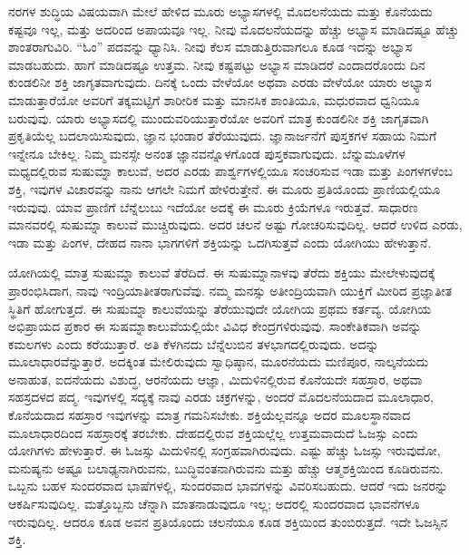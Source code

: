 ನರಗಳ ಶುದ್ಧಿಯ ವಿಷಯವಾಗಿ ಮೇಲೆ ಹೇಳಿದ ಮೂರು ಅಭ್ಯಾಸಗಳಲ್ಲಿ ಮೊದಲನೆಯದು ಮತ್ತು ಕೊನೆಯದು ಕಷ್ಟವೂ ಇಲ್ಲ, ಮತ್ತು ಅದರಿಂದ ಅಪಾಯವೂ ಇಲ್ಲ. ನೀವು ಮೊದಲನೆಯದನ್ನು ಹೆಚ್ಚು ಅಭ್ಯಾಸ ಮಾಡಿದಷ್ಟೂ ಹೆಚ್ಚು ಶಾಂತರಾಗುವಿರಿ. “ಓಂ” ಪದವನ್ನು ಧ್ಯಾನಿಸಿ. ನೀವು ಕೆಲಸ ಮಾಡುತ್ತಿರುವಾಗಲೂ ಕೂಡ ಇದನ್ನು ಅಭ್ಯಾಸ ಮಾಡಬಹುದು. ಹಾಗೆ ಮಾಡಿದಷ್ಟೂ ಉತ್ತಮ. ನೀವು ಕಷ್ಟಪಟ್ಟು ಅಭ್ಯಾಸ ಮಾಡಿದರೆ ಎಂದಾದರೊಂದು ದಿನ ಕುಂಡಲಿನೀ ಶಕ್ತಿ ಜಾಗೃತವಾಗುವುದು. ದಿನಕ್ಕೆ ಒಂದು ವೇಳೆಯೋ ಅಥವಾ ಎರಡು ವೇಳೆಯೋ ಯಾರು ಅಭ್ಯಾಸ ಮಾಡುತ್ತಾರೆಯೋ ಅವರಿಗೆ ತಕ್ಕಮಟ್ಟಿಗೆ ಶಾರೀರಿಕ ಮತ್ತು ಮಾನಸಿಕ ಶಾಂತಿಯೂ, ಮಧುರವಾದ ಧ್ವನಿಯೂ ಬರುವುವು. ಯಾರು ಅಭ್ಯಾಸದಲ್ಲಿ ಮುಂದುವರಿಯುತ್ತಾರೆಯೋ ಅವರಿಗೆ ಮಾತ್ರ ಕುಂಡಲಿನೀ ಶಕ್ತಿ ಜಾಗೃತವಾಗಿ ಪ್ರಕೃತಿಯೆಲ್ಲ ಬದಲಾಯಿಸುವುದು, ಜ್ಞಾನ ಭಂಡಾರ ತೆರೆಯುವುದು. ಜ್ಞಾನಾರ್ಜನೆಗೆ ಪುಸ್ತಕಗಳ ಸಹಾಯ ನಿಮಗೆ ಇನ್ನೇನೂ ಬೇಕಿಲ್ಲ. ನಿಮ್ಮ ಮನಸ್ಸೇ ಅನಂತ ಜ್ಞಾನವನ್ನೊಳಗೊಂಡ ಪುಸ್ತಕವಾಗುವುದು. ಬೆನ್ನುಮೂಳೆಗಳ ಮಧ್ಯದಲ್ಲಿರುವ ಸುಷುಮ್ನಾ ಕಾಲುವೆ, ಅದರ ಎರಡು ಪಾರ್ಶ್ವಗಳಲ್ಲಿಯೂ ಸಂಚರಿಸುವ ಇಡಾ ಮತ್ತು ಪಿಂಗಳಗಳೆಂಬ ಶಕ್ತಿ, ಇವುಗಳ ವಿಚಾರವನ್ನು ನಾನು ಆಗಲೇ ನಿಮಗೆ ಹೇಳಿರುತ್ತೇನೆ. ಈ ಮೂರು ಪ್ರತಿಯೊಂದು ಪ್ರಾಣಿಯಲ್ಲಿಯೂ ಇರುವುವು. ಯಾವ ಪ್ರಾಣಿಗೆ ಬೆನ್ನೆಲುಬು ಇದೆಯೋ ಅದಕ್ಕೆ ಈ ಮೂರು ಕ್ರಿಯೆಗಳೂ ಇರುತ್ತವೆ. ಸಾಧಾರಣ ಮಾನವರಲ್ಲಿ ಸುಷುಮ್ನಾ ಕಾಲುವೆ ಮುಚ್ಚಿರುವುದು. ಅದರ ಚಲನೆ ಅಷ್ಟು ಗೋಚರಿಸುವುದಿಲ್ಲ. ಆದರೆ ಉಳಿದ ಎರಡು, ಇಡಾ ಮತ್ತು ಪಿಂಗಳ, ದೇಹದ ನಾನಾ ಭಾಗಗಳಿಗೆ ಶಕ್ತಿಯನ್ನು ಒದಗಿಸುತ್ತವೆ ಎಂದು ಯೋಗಿಯು ಹೇಳುತ್ತಾನೆ. 

\eject


ಯೋಗಿಯಲ್ಲಿ ಮಾತ್ರ ಸುಷುಮ್ನಾ ಕಾಲುವೆ ತೆರೆದಿದೆ. ಈ ಸುಷುಮ್ನಾನಾಳವು ತೆರೆದು ಶಕ್ತಿಯು ಮೇಲೇಳುವುದಕ್ಕೆ ಪ್ರಾರಂಭಿಸಿದಾಗ, ನಾವು ಇಂದ್ರಿಯಾತೀತರಾಗುವೆವು. ನಮ್ಮ ಮನಸ್ಸು ಅತೀಂದ್ರಿಯವಾಗಿ ಯುಕ್ತಿಗೆ ಮೀರಿದ ಪ್ರಜ್ಞಾತೀತ ಸ್ಥಿತಿಗೆ ಹೋಗುತ್ತದೆ. ಈ ಸುಷುಮ್ನಾ ಕಾಲುವೆಯನ್ನು ತೆರೆಯುವುದೇ ಯೋಗಿಯ ಪ್ರಥಮ ಕರ್ತವ್ಯ. ಯೋಗಿಯ ಅಭಿಪ್ರಾಯದ ಪ್ರಕಾರ ಈ ಸುಷಮ್ನಾಕಾಲುವೆಯಲ್ಲಿಯೇ ವಿವಿಧ ಕೇಂದ್ರಗಳಿರುವುವು. ಸಾಂಕೇತಿಕವಾಗಿ ಅವನ್ನು ಕಮಲಗಳು ಎಂದು ಕರೆಯುತ್ತಾರೆ. ಅತಿ ಕೆಳಗಿನದು ಬೆನ್ನೆಲುಬಿನ ತಳಭಾಗದಲ್ಲಿರುವುದು. ಅದನ್ನು ಮೂಲಾಧಾರವೆನ್ನುತ್ತಾರೆ. ಅದಕ್ಕಿಂತ ಮೇಲಿರುವುದು ಸ್ವಾಧಿಷ್ಠಾನ, ಮೂರನೆಯದು ಮಣಿಪೂರ, ನಾಲ್ಕನೆಯದು ಅನಾಹುತ, ಐದನೆಯದು ವಿಶುದ್ಧ, ಆರನೆಯದು ಆಜ್ಞಾ, ಮಿದುಳಿನಲ್ಲಿರುವ ಕೊನೆಯದೇ ಸಹಸ್ರಾರ, ಅಥವಾ ಸಹಸ್ರದಳದ ಪದ್ಮ. ಇವುಗಳಲ್ಲಿ ಸದ್ಯಕ್ಕೆ ನಾವು ಎರಡು ಚಕ್ರಗಳನ್ನು, ಅಂದರೆ ಮೊದಲನೆಯದಾದ ಮೂಲಾಧಾರ, ಕೊನೆಯದಾದ ಸಹಸ್ರಾರ ಇವುಗಳನ್ನು ಮಾತ್ರ ಗಮನಿಸಬೇಕು. ಶಕ್ತಿಯೆಲ್ಲವನ್ನೂ ಅದರ ಮೂಲಸ್ಥಾನವಾದ ಮೂಲಾಧಾರದಿಂದ ಸಹಸ್ರಾರಕ್ಕೆ ತರಬೇಕು. ದೇಹದಲ್ಲಿರುವ ಶಕ್ತಿಯಲ್ಲೆಲ್ಲ ಉತ್ತಮವಾದುದೆ ಓಜಸ್ಸು ಎಂದು ಯೋಗಿಗಳು ಹೇಳುತ್ತಾರೆ. ಈ ಓಜಸ್ಸು ಮಿದುಳಿನಲ್ಲಿ ಸಂಗ್ರಹವಾಗಿರುವುದು. ಎಷ್ಟು ಹೆಚ್ಚು ಓಜಸ್ಸು ಇರುವುದೋ, ಮನುಷ್ಯನು ಅಷ್ಟೂ ಬಲಾಢ್ಯನಾಗಿರುವನು, ಬುದ್ಧಿವಂತನಾಗಿರುವನು ಮತ್ತು ಹೆಚ್ಚು ಆತ್ಮಶಕ್ತಿಯಿಂದ ಕೂಡಿರುವನು. ಒಬ್ಬನು ಬಹಳ ಸುಂದರವಾದ ಭಾಷೆಗಳಲ್ಲಿ, ಸುಂದರವಾದ ಭಾವಗಳನ್ನು ವಿವರಿಸಬಹುದು. ಆದರೆ ಇದು ಜನರನ್ನು ಆಕರ್ಷಿಸುವುದಿಲ್ಲ. ಮತ್ತೊಬ್ಬನು ಚೆನ್ನಾಗಿ ಮಾತನಾಡುವುದೂ ಇಲ್ಲ; ಅದರಲ್ಲಿ ಸುಂದರವಾದ ಭಾವನೆಗಳೂ ಇರುವುದಿಲ್ಲ. ಆದರೂ ಕೂಡ ಅವನ ಪ್ರತಿಯೊಂದು ಚಲನೆಯೂ ಕೂಡ ಶಕ್ತಿಯಿಂದ ತುಂಬಿರುತ್ತದೆ. ಇದೇ ಓಜಸ್ಸಿನ ಶಕ್ತಿ. 

\vskip 6pt

